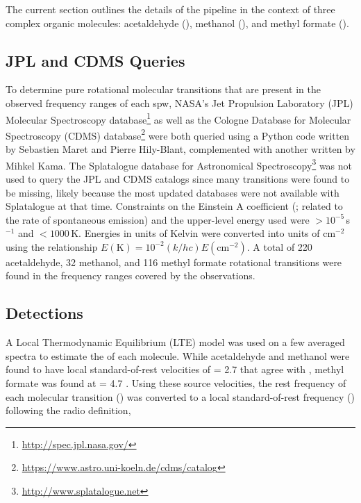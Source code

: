 \documentclass[iop,twocolappendix]{emulateapj}
\begin{document}
The current section outlines the details of the pipeline in the context of three complex organic molecules: acetaldehyde (\A), methanol (\M), and methyl formate (\MF). 

\subsection{JPL and CDMS Queries}
\label{subsec:queries}

To determine pure rotational molecular transitions that are present in the observed frequency ranges of each spw, NASA's Jet Propulsion Laboratory (JPL) Molecular Spectroscopy database\footnote{\url{http://spec.jpl.nasa.gov/}} as well as the Cologne Database for Molecular Spectroscopy (CDMS) database\footnote{\url{https://www.astro.uni-koeln.de/cdms/catalog}} were both queried using a Python code written by Sebastien Maret and Pierre Hily-Blant, complemented with another written by Mihkel Kama. The Splatalogue database for Astronomical Spectroscopy\footnote{\url{http://www.splatalogue.net}} was not used to query the JPL and CDMS catalogs since many transitions were found to be missing, likely because the most updated databases were not available with Splatalogue at that time. Constraints on the Einstein A coefficient ({\Aul}; related to the rate of spontaneous emission) and the upper-level energy used were {\Aul} $> 10^{-5}$\,s$^{-1}$ and {\Eul} $< 1000$\,K. Energies in units of Kelvin were converted into units of cm$^{-2}$ using the relationship $E(\mathrm{K}) = 10^{-2} (k/hc) E(\mathrm{cm^{-2}})$. A total of 220 acetaldehyde, 32 methanol, and 116 methyl formate rotational transitions were found in the frequency ranges covered by the observations.

\subsection{Detections}
\label{subsec:detections}

A Local Thermodynamic Equilibrium (LTE) model was used on a few averaged spectra to estimate the {\vLSR} of each molecule. While acetaldehyde and methanol were found to have local standard-of-rest velocities of {\vLSR} = 2.7 {\kms} that agree with \citet{Jorgensen2011}, methyl formate was found at {\vLSR} = 4.7 \kms. Using these source velocities, the rest frequency of each molecular transition (\restfreq) was converted to a local standard-of-rest frequency (\nuLSR) following the radio definition,
\end{document}
